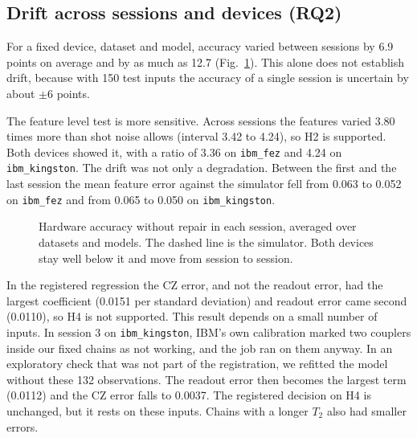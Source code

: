 \documentclass[10pt,conference]{IEEEtran}
\begin{document}
\subsection{Drift across sessions and devices (RQ2)}
For a fixed device, dataset and model, accuracy varied between sessions by 6.9
points on average and by as much as 12.7 (Fig.~\ref{fig:drift}). This alone does not establish drift, because with 150 test inputs the accuracy of a single session
is uncertain by about $\pm$6 points.

The feature level test is more sensitive. Across sessions the features varied 3.80 times more than
shot noise allows (interval 3.42 to 4.24), so H2 is supported. Both devices showed it, with a
ratio of 3.36 on \texttt{ibm\_fez} and 4.24 on \texttt{ibm\_kingston}. The drift was not only a degradation. Between the first and the last session the
mean feature error against the simulator fell from 0.063 to 0.052 on \texttt{ibm\_fez} and from
0.065 to 0.050 on \texttt{ibm\_kingston}.

\begin{figure}[t]
\centering
{}
\caption{Hardware accuracy without repair in each session, averaged over datasets and models. The
dashed line is the simulator. Both devices stay well below it and move from session to session.}
\label{fig:drift}
\end{figure}

In the registered regression the CZ error, and not the readout error, had the largest coefficient (0.0151 per
standard deviation) and readout error came second (0.0110), so H4 is not supported. This result depends on a small number of inputs. In session 3 on \texttt{ibm\_kingston}, IBM's own
calibration marked two couplers inside our fixed chains as not working, and the job ran on them
anyway. In an exploratory check that was not part of the registration, we refitted the model without
these 132 observations. The readout error then becomes the largest term (0.0112) and the CZ error
falls to 0.0037. The registered decision on H4 is unchanged, but it rests on these inputs. Chains with a longer $T_2$ also had smaller errors.
\end{document}
